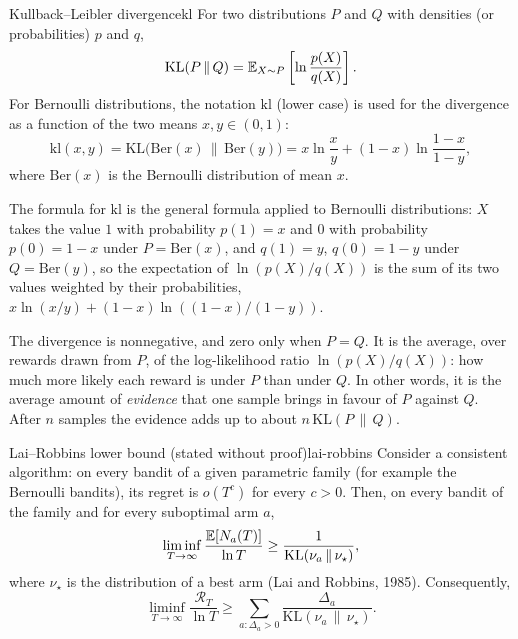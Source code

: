 \begin{definition}{Kullback--Leibler divergence}{kl}
  For two distributions $P$ and $Q$ with densities (or probabilities) $p$
  and $q$,
  \begin{equation}
    \mathrm{KL}(P \,\|\, Q) = \mathbb{E}_{X \sim P}\left[ \ln \frac{p(X)}{q(X)}
    \right].
  \end{equation}
  For Bernoulli distributions, the notation $\mathrm{kl}$ (lower case) is
  used for the divergence as a function of the two means $x, y \in (0, 1)$:
  \begin{equation}
    \label{eq:kl-bernoulli}
    \mathrm{kl}(x, y) = \mathrm{KL}\big(\mathrm{Ber}(x) \,\|\,
    \mathrm{Ber}(y)\big) = x \ln \frac{x}{y} + (1 - x) \ln \frac{1 - x}{1 -
    y},
  \end{equation}
  where $\mathrm{Ber}(x)$ is the Bernoulli distribution of mean $x$.
\end{definition}

The formula for $\mathrm{kl}$ is the general formula applied to Bernoulli
distributions: $X$ takes the value $1$ with probability $p(1) = x$ and $0$
with probability $p(0) = 1 - x$ under $P = \mathrm{Ber}(x)$, and $q(1) = y$,
$q(0) = 1 - y$ under $Q = \mathrm{Ber}(y)$, so the expectation of $\ln(p(X)
/ q(X))$ is the sum of its two values weighted by their probabilities, $x
\ln(x/y) + (1 - x) \ln((1 - x)/(1 - y))$.

The divergence is nonnegative, and zero only when $P = Q$. It is the
average, over rewards drawn from $P$, of the log-likelihood ratio $\ln
(p(X) / q(X))$: how much more likely each reward is under $P$ than under
$Q$. In other words, it is the average amount of \emph{evidence} that one
sample brings in favour of $P$ against $Q$. After $n$ samples the evidence
adds up to about $n\, \mathrm{KL}(P \,\|\, Q)$.

\begin{theorem}{Lai--Robbins lower bound (stated without proof)}{lai-robbins}
  Consider a consistent algorithm: on every bandit of a given parametric
  family (for example the Bernoulli bandits), its regret is $o(T^c)$
  for every $c > 0$. Then, on every bandit of the family and for every
  suboptimal arm $a$,
  \begin{equation}
    \liminf_{T \to \infty} \frac{\mathbb{E}[N_a(T)]}{\ln T} \geq
    \frac{1}{\mathrm{KL}(\nu_a \,\|\, \nu_\star)},
  \end{equation}
  where $\nu_\star$ is the distribution of a best arm (Lai and Robbins,
  1985). Consequently,
  \begin{equation}
    \liminf_{T \to \infty} \frac{\mathcal{R}_T}{\ln T} \geq \sum_{a :
    \Delta_a > 0} \frac{\Delta_a}{\mathrm{KL}(\nu_a \,\|\, \nu_\star)}.
  \end{equation}
\end{theorem}

